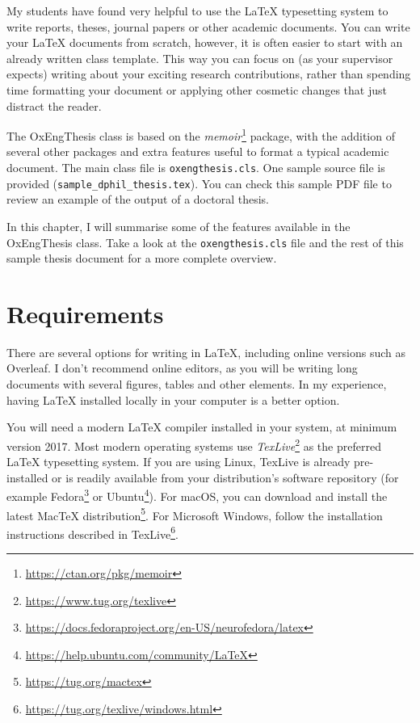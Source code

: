 My students have found very helpful to use the LaTeX typesetting system to write reports, theses, journal papers or other academic documents. You can write your LaTeX documents from scratch, however, it is often easier to start with an already written class template. This way you can focus on (as your supervisor expects) writing about your exciting research contributions, rather than spending time formatting your document or applying other cosmetic changes that just distract the reader. 

The OxEngThesis class is based on the \textit{memoir}\footnote{\url{https://ctan.org/pkg/memoir}} package, with the addition of several other packages and extra features useful to format a typical academic document. The main class file is \verb|oxengthesis.cls|. One sample source file is provided (\verb|sample_dphil_thesis.tex|). You can check this sample
PDF file to review an example of the output of a doctoral thesis.

In this chapter, I will summarise some of the features available in the OxEngThesis class. Take a look at the \verb|oxengthesis.cls| file and the rest of this sample thesis document for a more complete overview.


\section{Requirements}


There are several options for writing in LaTeX, including online versions such as Overleaf. I don't recommend online editors, as you will be writing long documents with several figures, tables and other elements. In my experience, having LaTeX installed locally in your computer is a better option.

You will need a modern LaTeX compiler installed in your system, at minimum version 2017. Most modern operating systems use \textit{TexLive}\footnote{\url{https://www.tug.org/texlive}} as the preferred LaTeX typesetting system. If you are using Linux, TexLive is already pre-installed or is readily 
available from your distribution's software repository (for example Fedora\footnote{\url{https://docs.fedoraproject.org/en-US/neurofedora/latex}} or Ubuntu\footnote{\url{https://help.ubuntu.com/community/LaTeX}}). For macOS, you can download and install the latest MacTeX distribution\footnote{\url{https://tug.org/mactex}}. For Microsoft Windows, follow the installation instructions described in TexLive\footnote{\url{https://tug.org/texlive/windows.html}}.

